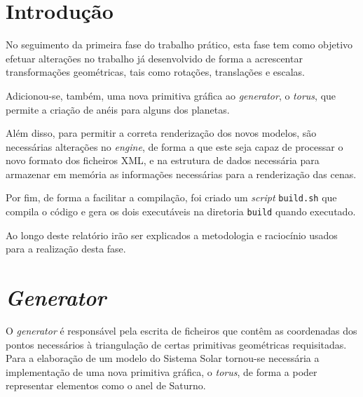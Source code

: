 \documentclass[a4paper, 11pt]{article}
\begin{document}
\pagebreak

\tableofcontents
\listoffigures

\pagebreak


\pagestyle{fancy}
\fancyhf{}


\renewcommand{\headrulewidth}{0pt}

\section{Introdução}

No seguimento da primeira fase do trabalho prático, esta fase tem como objetivo
efetuar alterações no trabalho já desenvolvido de forma a acrescentar transformações
geométricas, tais como rotações, translações e escalas.

Adicionou-se, também, uma nova primitiva gráfica ao \textit{generator}, o \textit{torus},
que permite a criação de anéis para alguns dos planetas.

Além disso, para permitir a correta renderização dos novos modelos, são necessárias
alterações no \textit{engine}, de forma a que este seja capaz de processar o novo
formato dos ficheiros XML, e na estrutura de dados necessária para armazenar em
memória as informações necessárias para a renderização das cenas.

Por fim, de forma a facilitar a compilação, foi criado um \textit{script} \texttt{build.sh}
que compila o código e gera os dois executáveis na diretoria \texttt{build} quando executado.

Ao longo deste relatório irão ser explicados a metodologia e raciocínio usados
para a realização desta fase.

\pagebreak

\section{\textit{Generator}}

O \textit{generator} é responsável pela escrita de ficheiros que contêm as coordenadas
dos pontos necessários à triangulação de certas primitivas geométricas requisitadas.
Para a elaboração de um modelo do Sistema Solar tornou-se necessária a implementação
de uma nova primitiva gráfica, o \textit{torus}, de forma a poder representar elementos
como o anel de Saturno.
\end{document}

